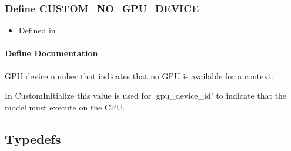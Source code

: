 \documentclass[letterpaper,10pt,english]{sphinxmanual}
\begin{document}
\subsubsection{Define CUSTOM\_NO\_GPU\_DEVICE}
\label{\detokenize{cpp_api/define_custom_8h_1aaf537da73bb55fda05fb4e39defe1949:define-custom-no-gpu-device}}\label{\detokenize{cpp_api/define_custom_8h_1aaf537da73bb55fda05fb4e39defe1949:exhale-define-custom-8h-1aaf537da73bb55fda05fb4e39defe1949}}\label{\detokenize{cpp_api/define_custom_8h_1aaf537da73bb55fda05fb4e39defe1949::doc}}\begin{itemize}
\item {} 
Defined in {\hyperref[\detokenize{cpp_api/file_src_servables_custom_custom.h:file-src-servables-custom-custom-h}]{}}

\end{itemize}


\paragraph{Define Documentation}
\label{\detokenize{cpp_api/define_custom_8h_1aaf537da73bb55fda05fb4e39defe1949:define-documentation}}

\begin{fulllineitems}
\label{\detokenize{cpp_api/define_custom_8h_1aaf537da73bb55fda05fb4e39defe1949:c.CUSTOM_NO_GPU_DEVICE}}
GPU device number that indicates that no GPU is available for a context. 

In CustomInitialize this value is used for ‘gpu\_device\_id’ to indicate that the model must execute on the CPU. 

\end{fulllineitems}



\subsection{Typedefs}
\label{\detokenize{cpp_api/cpp_api_root:typedefs}}
\end{document}
